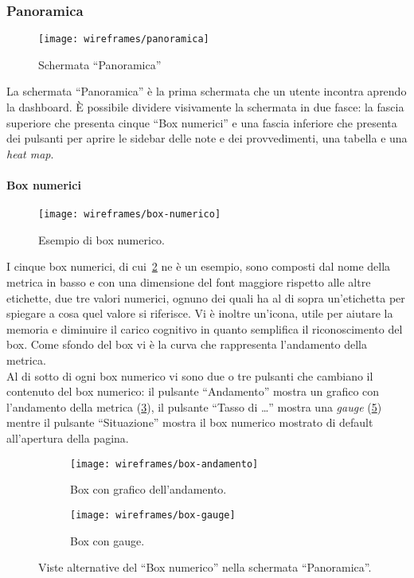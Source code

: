 \subsubsection{Panoramica}\label{ss:panoramica}
\begin{figure}[H]
    \centering
    \texttt{[image: wireframes/panoramica]}
    \caption{Schermata ``Panoramica''}
    \label{fig:panoramica}
\end{figure}
La schermata ``Panoramica'' è la prima schermata che un utente incontra aprendo la dashboard. \`E possibile dividere visivamente la schermata in due fasce: la fascia superiore che presenta cinque ``Box numerici'' e una fascia inferiore che presenta dei pulsanti per aprire le sidebar delle note e dei provvedimenti, una tabella e una \textit{heat map}.\\

\paragraph{Box numerici}
\begin{figure}[H]
    \centering
    \texttt{[image: wireframes/box-numerico]}
    \caption{Esempio di box numerico.}
    \label{fig:box-numerico}
\end{figure}

I cinque box numerici, di cui~\ref{fig:box-numerico} ne è un esempio, sono composti dal nome della metrica in basso e con una dimensione del font maggiore rispetto alle altre etichette, due tre valori numerici, ognuno dei quali ha al di sopra un'etichetta per spiegare a cosa quel valore si riferisce. Vi è inoltre un'icona, utile per aiutare la memoria e diminuire il carico cognitivo in quanto semplifica il riconoscimento del box. Come sfondo del box vi è la curva che rappresenta l'andamento della metrica.\\
Al di sotto di ogni box numerico vi sono due o tre pulsanti che cambiano il contenuto del box numerico: il pulsante ``Andamento'' mostra un grafico con l'andamento della metrica (\ref{fig:box-andamento}), il pulsante ``Tasso di \dots'' mostra una \textit{gauge} (\ref{fig:box-gauge}) mentre il pulsante ``Situazione'' mostra il box numerico mostrato di default all'apertura della pagina.

\begin{figure}[H]
    \begin{subfigure}[b]{0.5\textwidth}
        \centering
        \texttt{[image: wireframes/box-andamento]}
        \caption{Box con grafico dell'andamento.}
        \label{fig:box-andamento}
    \end{subfigure}
\hfill
    \begin{subfigure}[b]{0.5\textwidth}
        \centering
        \texttt{[image: wireframes/box-gauge]}
        \caption{Box con gauge.}
        \label{fig:box-gauge}
    \end{subfigure}
    \caption{Viste alternative del ``Box numerico'' nella schermata ``Panoramica''.}
\end{figure}


